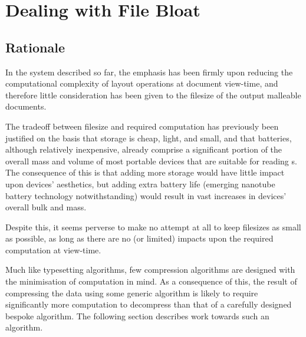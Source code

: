 \chapter{Dealing with File Bloat}\label{ch:bloat}


\section{Rationale}
In the system described so far, the emphasis has been firmly upon reducing the computational complexity of layout operations at document view-time, and therefore little consideration has been given to the filesize of the output malleable documents.


The tradeoff between filesize and required computation has previously been justified on the basis that storage is cheap, light, and small, and that batteries, although relatively inexpensive, already comprise a significant portion of the overall mass and volume of most portable devices that are suitable for reading \ebook{}s. The consequence of this is that adding more storage would have little impact upon devices' aesthetics, but adding extra battery life (emerging nanotube battery technology notwithstanding) would result in vast increases in devices' overall bulk and mass.

Despite this, it seems perverse to make no attempt at all to keep filesizes as small as possible, as long as there are no (or limited) impacts upon the required computation at view-time.

Much like typesetting algorithms, few compression algorithms are designed with the minimisation of computation in mind. As a consequence of this, the result of compressing the data using some generic algorithm is likely to require significantly more computation to decompress than that of a carefully designed bespoke algorithm. The following section describes work towards such an algorithm.


